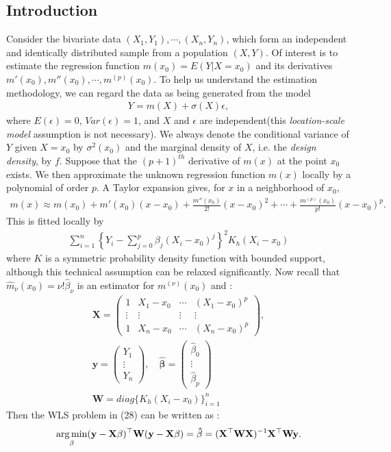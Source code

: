 \documentclass[12pt]{article}
\renewcommand{\=}[1]{\stackrel{#1}{=}} %
\theoremstyle{definition}
\begin{document}
\subsection{Introduction}
	Consider the bivariate data $( X_1 , Y_1 ) , \cdots , ( X_n , Y_n )$, which form an independent and identically distributed sample from a population $(X, Y)$. Of interest is to estimate the regression function $m(x_0)=E(Y|X=x_0)$ and its derivatives $m'(x_0), m''(x_0),\cdots,m^{(p)}(x_0)$. To help us understand the estimation methodology, we can regard the data as being generated from the model
	\begin{align}
	Y=m(X) + \sigma(X)\epsilon,
	\end{align}
	where $E(\epsilon)=0$, $Var(\epsilon)=1$, and $X$ and $\epsilon$ are independent(this \textit{location-scale model} assumption is not necessary). We always denote the conditional variance of $Y$ given $X=x_0$ by $\sigma^2(x_0)$ and the marginal density of $X$, i.e. the \textit{design density}, by $f$. Suppose that the $(p+ 1)^{th}$ derivative of $m(x)$ at the point $x_0$ exists. We then approximate the unknown regression function $m(x)$ locally by a polynomial of order $p$. A Taylor expansion gives, for $x$ in a neighborhood of $x_0$,
	\begin{align}
	m(x)\approx m(x_0)+m'(x_0)(x-x_0)+\frac{m''(x_0)}{2!}(x-x_0)^2+\cdots+\frac{m^{(p)}(x_0)}{p!}(x-x_0)^p.
	\end{align}
	This is fitted locally by
	\begin{align}
	\sum_{i=1}^n\left\{Y_i-\sum_{j=0}^p\beta_j(X_i-x_0)^j\right\}^2K_h(X_i-x_0)
	\end{align}
	where $K$ is a symmetric probability density function with bounded support, although this technical assumption can be relaxed significantly. Now recall that $\hat{m}_{\nu}(x_0)=\nu!\hat{\beta}_{\nu}$ is an estimator for $m^{(\nu)}(x_0)$ and :
	\begin{align}
	\mathbf{X}=\left(\begin{array}{cccc}
	1 & X_1-x_0 & \cdots & (X_1-x_0)^p \\
	\vdots & \vdots & \vdots & \vdots \\
	1 & X_n-x_0 & \cdots & (X_n-x_0)^p
	\end{array}\right),\\
	\mathbf{y}=\left(\begin{array}{c}
	Y_1 \\ \vdots \\ Y_n
	\end{array}\right),\quad
	\mathbf{\hat{\beta}}=\left(\begin{array}{c}
	\hat{\beta}_0 \\ \vdots \\ \hat{\beta}_p
	\end{array}\right)\\
	\mathbf{W}=diag\{K_h(X_i-x_0)\}_{i=1}^n
	\end{align}
	Then the WLS problem in (28) can be written as :
	\begin{align}
	\underset{\mathbf{\beta}}{\arg\min}\bf(y-X\beta)^{\top}W(y-X\beta)=\hat{\beta}=
	(X^{\top}WX)^{\rm-1}\bf X^{\top}Wy.
	\end{align}
\end{document}

